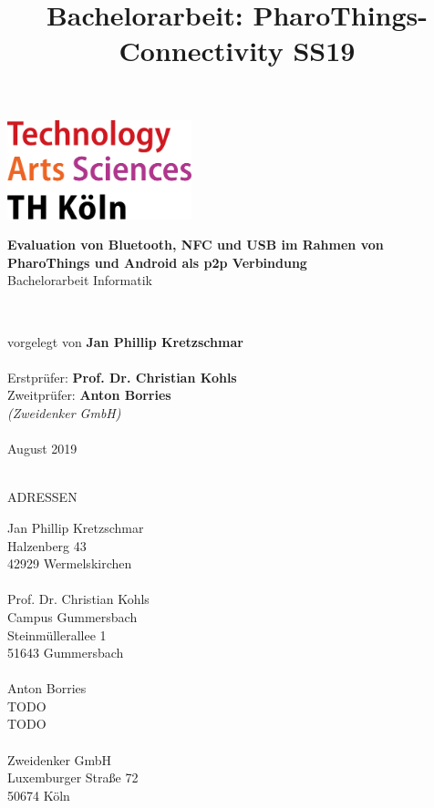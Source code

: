\documentclass[12pt,a4paper]{article}
\title{Bachelorarbeit: PharoThings-Connectivity SS19}
\begin{document}
	\begin{titlepage}
    \includegraphics[width=0.4\textwidth]{../latex-ai-project/th_logo.png}
    ~\\[2.5cm]
    \begin{center}
    \textbf{\huge Evaluation von Bluetooth, NFC und USB im Rahmen von PharoThings und Android als p2p Verbindung}\\[0.5cm]
    {\Large Bachelorarbeit Informatik}
    \vfill
    \end{center}
    ~\\[2.0cm]
    \begin{flushright}
    {\large vorgelegt von {\bf Jan Phillip Kretzschmar}}\\[0.1cm]
    ~\\[1.5cm]
    {\large Erstprüfer: {\bf Prof. Dr. Christian Kohls}}
    ~\\[0.75cm]
    {\large Zweitprüfer: {\bf Anton Borries}}\\[0.1cm]
    {\large {\it (Zweidenker GmbH)}}\\[0.1cm]

	~\\[1.25cm]
    {\large August 2019}
	\end{flushright}
	\end{titlepage}
	\pagebreak
	\begin{titlepage}
	~\\[7.5cm]
    {\large ADRESSEN}
	~\\[1.0cm]
	\begin{flushright}
    {\large Jan Phillip Kretzschmar}\\[0.1cm]
    {\large Halzenberg 43}\\[0.1cm]
    {\large 42929 Wermelskirchen}\\[0.1cm]
    ~\\[1.0cm]
    {\large Prof. Dr. Christian Kohls}\\[0.1cm]
    {\large Campus Gummersbach}\\[0.1cm]
    {\large Steinmüllerallee 1}\\[0.1cm]
    {\large 51643 Gummersbach}\\[0.1cm]
    ~\\[1.0cm]
    {\large Anton Borries}\\[0.1cm]
    {\large TODO}\\[0.1cm]
    {\large TODO}\\[0.1cm]
    ~\\[1.0cm]
    {\large Zweidenker GmbH}\\[0.1cm]
    {\large Luxemburger Straße 72}\\[0.1cm]
    {\large 50674 Köln}\\[0.1cm]
	\end{flushright}
    \end{titlepage}
    \pagebreak
\end{document}
